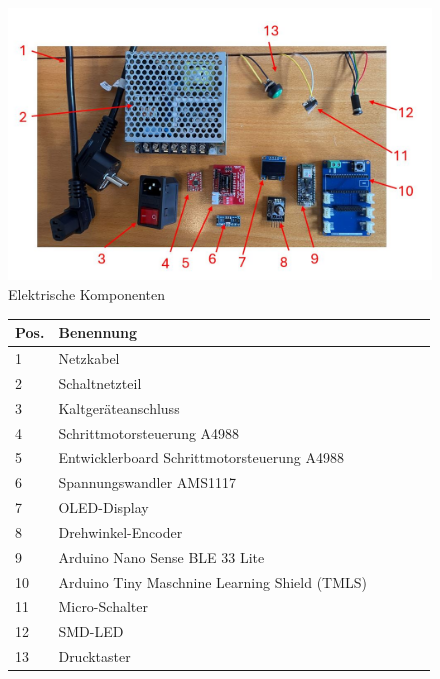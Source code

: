 \begin{figure}[H]
	\begin{center}
		\includegraphics[width=\textwidth]{Images/ElekKomp.jpg}
		\caption{Elektrische Komponenten} \label{ElekKomb}
	\end{center}
\end{figure}

\begin{figure}[H]
	\begin{center}
		\fontsize{8}{10}\selectfont
		\begin{tabularx}{\textwidth}{|p{0.4cm}|X|X|X|X|X|} 
			\hline 
			\textbf{Pos.} &  \textbf{Benennung} \\ \hline
			1 & Netzkabel   \\ \hline
			2 & Schaltnetzteil   \\ \hline
			3 & Kaltgeräteanschluss   \\ \hline
			4 & Schrittmotorsteuerung A4988   \\ \hline
			5 & Entwicklerboard Schrittmotorsteuerung A4988   \\ \hline
			6 & Spannungswandler AMS1117 \\ \hline
			7 & OLED-Display  \\ \hline
			8 & Drehwinkel-Encoder  \\ \hline
			9 & Arduino Nano Sense BLE 33 Lite  \\ \hline
			10 & Arduino Tiny Maschnine Learning Shield (TMLS) \\ \hline
			11 & Micro-Schalter  \\ \hline
			12 & SMD-LED \\ \hline
			13 & Drucktaster  \\ \hline
					
		\end{tabularx}
			\label{ElekTab}
	\end{center}
\end{figure}

